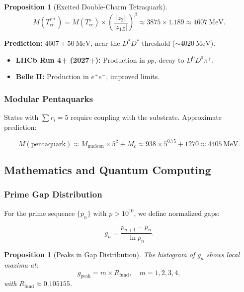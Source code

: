 \documentclass[11pt, a4paper]{article}
\theoremstyle{plain}
\newtheorem{proposition}[theorem]{Proposition}
\theoremstyle{definition}
\newcommand{\Rfactor}{R_{\text{fund}}}
\begin{document}
\begin{proposition}[Excited Double-Charm Tetraquark]
\begin{equation}
M(T_{cc}^{**}) = M(T_{cc}^+) \times \left(\frac{|z_2|}{|z_{1.5}|}\right)^\beta \approx 3875 \times 1.189 \approx 4607\ \si{\mega\electronvolt}.
\end{equation}
\end{proposition}

\textbf{Prediction:} $4607 \pm 50\ \si{\mega\electronvolt}$, near the $D^*D^*$ threshold ($\sim 4020\ \si{\mega\electronvolt}$).

\begin{itemize}
    \item \textbf{LHCb Run 4+ (2027+):} Production in $pp$, decay to $D^0D^0\pi^+$.
    \item \textbf{Belle II:} Production in $e^+e^-$, improved limits.
\end{itemize}

\subsubsection{Modular Pentaquarks}

States with $\sum r_i = 5$ require coupling with the substrate. Approximate prediction:

\begin{equation}
M(\text{pentaquark}) \approx M_{\text{nucleon}} \times 5^\beta + M_c \approx 938 \times 5^{0.75} + 1270 \approx 4405\ \si{\mega\electronvolt}.
\end{equation}

\subsection{Mathematics and Quantum Computing}

\subsubsection{Prime Gap Distribution}

For the prime sequence $\{p_n\}$ with $p > 10^{10}$, we define normalized gaps:

\begin{equation}
g_n = \frac{p_{n+1} - p_n}{\ln p_n}.
\end{equation}

\begin{proposition}[Peaks in Gap Distribution]
The histogram of $g_n$ shows local maxima at:
\begin{equation}
g_{\text{peak}} = m \times \Rfactor, \quad m = 1, 2, 3, 4,
\end{equation}
with $\Rfactor \approx 0.105155$.
\end{proposition}
\end{document}
